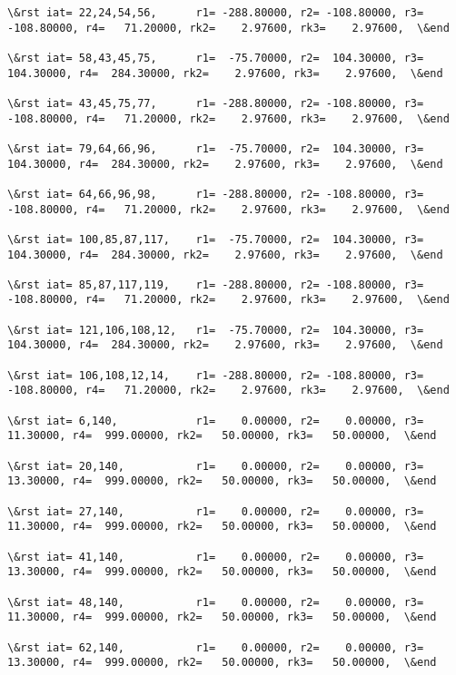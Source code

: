 \documentclass[11pt]{article}
\begin{document}
\begin{Verbatim}[commandchars=\\\{\}]
\&rst iat= 22,24,54,56,      r1= -288.80000, r2= -108.80000, r3= -108.80000, r4=   71.20000, rk2=    2.97600, rk3=    2.97600,  \&end

\&rst iat= 58,43,45,75,      r1=  -75.70000, r2=  104.30000, r3=  104.30000, r4=  284.30000, rk2=    2.97600, rk3=    2.97600,  \&end

\&rst iat= 43,45,75,77,      r1= -288.80000, r2= -108.80000, r3= -108.80000, r4=   71.20000, rk2=    2.97600, rk3=    2.97600,  \&end

\&rst iat= 79,64,66,96,      r1=  -75.70000, r2=  104.30000, r3=  104.30000, r4=  284.30000, rk2=    2.97600, rk3=    2.97600,  \&end

\&rst iat= 64,66,96,98,      r1= -288.80000, r2= -108.80000, r3= -108.80000, r4=   71.20000, rk2=    2.97600, rk3=    2.97600,  \&end

\&rst iat= 100,85,87,117,    r1=  -75.70000, r2=  104.30000, r3=  104.30000, r4=  284.30000, rk2=    2.97600, rk3=    2.97600,  \&end

\&rst iat= 85,87,117,119,    r1= -288.80000, r2= -108.80000, r3= -108.80000, r4=   71.20000, rk2=    2.97600, rk3=    2.97600,  \&end

\&rst iat= 121,106,108,12,   r1=  -75.70000, r2=  104.30000, r3=  104.30000, r4=  284.30000, rk2=    2.97600, rk3=    2.97600,  \&end

\&rst iat= 106,108,12,14,    r1= -288.80000, r2= -108.80000, r3= -108.80000, r4=   71.20000, rk2=    2.97600, rk3=    2.97600,  \&end

\&rst iat= 6,140,            r1=    0.00000, r2=    0.00000, r3=   11.30000, r4=  999.00000, rk2=   50.00000, rk3=   50.00000,  \&end

\&rst iat= 20,140,           r1=    0.00000, r2=    0.00000, r3=   13.30000, r4=  999.00000, rk2=   50.00000, rk3=   50.00000,  \&end

\&rst iat= 27,140,           r1=    0.00000, r2=    0.00000, r3=   11.30000, r4=  999.00000, rk2=   50.00000, rk3=   50.00000,  \&end

\&rst iat= 41,140,           r1=    0.00000, r2=    0.00000, r3=   13.30000, r4=  999.00000, rk2=   50.00000, rk3=   50.00000,  \&end

\&rst iat= 48,140,           r1=    0.00000, r2=    0.00000, r3=   11.30000, r4=  999.00000, rk2=   50.00000, rk3=   50.00000,  \&end

\&rst iat= 62,140,           r1=    0.00000, r2=    0.00000, r3=   13.30000, r4=  999.00000, rk2=   50.00000, rk3=   50.00000,  \&end


\end{Verbatim}
\end{document}

